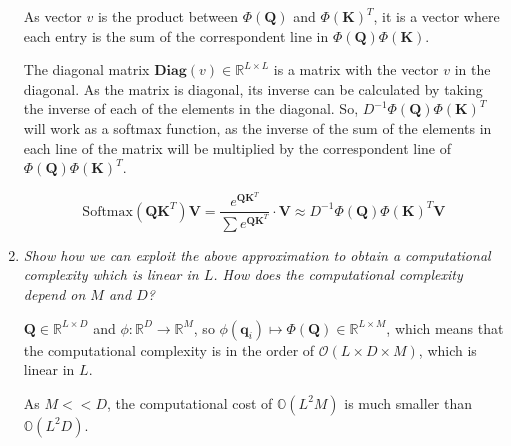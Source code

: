 \documentclass[12pt]{article}
\begin{document}
\begin{enumerate}[leftmargin=\labelsep]
          \vspace{12pt}

          As vector $v$ is the product between $\Phi(\textbf{Q})$ and $\Phi(\textbf{K})^T$, it is a vector where each entry is the sum of the correspondent line in $\Phi(\textbf{Q})\Phi(\textbf{K})$.

          \vspace{12pt}

          The diagonal matrix $\textbf{Diag}(v) \in \mathbb{R}^{L \times L}$ is a matrix with the vector $v$ in the diagonal. As the matrix is diagonal, its inverse can be calculated by taking the inverse of each of the elements in the diagonal. So, $D^{-1} \Phi(\textbf{Q}) \Phi(\textbf{K})^T$ will work as a softmax function, as the inverse of the sum of the elements in each line of the matrix will be multiplied by the correspondent line of $\Phi(\textbf{Q}) \Phi(\textbf{K})^T$.

          \vspace{12pt}

          \begin{equation}
              \text{Softmax}(\textbf{QK}^T)\textbf{V} = \frac{e^{\textbf{QK}^T}}{\sum e^{\textbf{QK}^T}} \cdot \textbf{V} \approx D^{-1} \Phi(\textbf{Q}) \Phi(\textbf{K})^T \textbf{V}
          \end{equation}

    \item \textit{Show how we can exploit the above approximation to obtain a computational complexity which is linear in $L$. How does the computational complexity depend on $M$ and $D$?}

          \vspace{12pt}

          $\textbf{Q} \in \mathbb{R}^{L \times D}$ and $\phi: \mathbb{R}^D \rightarrow \mathbb{R}^M$, so $\phi(\textbf{q}_i) \mapsto \Phi(\textbf{Q}) \in \mathbb{R}^{L \times M}$, which means that the computational complexity is in the order of $\mathcal{O}(L \times D \times M)$, which is linear in $L$.

          \vspace{12pt}

          As $M << D$, the computational cost of $\mathbb{O}(L^2M)$ is much smaller than $\mathbb{O}(L^2D)$.

\end{enumerate}

\vspace{12pt}
\end{document}
